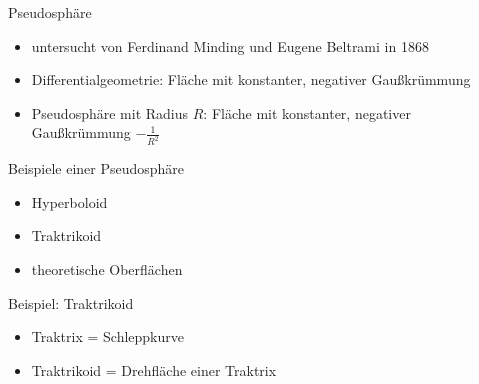 \documentclass[12pt]{beamer}
\begin{document}
\begin{frame}{Pseudosphäre}

\begin{itemize}
\item untersucht von Ferdinand Minding und Eugene Beltrami in 1868
\item Differentialgeometrie: Fläche mit konstanter, negativer Gaußkrümmung\cite{pseudo_wiki}
\item Pseudosphäre mit Radius $R$: Fläche mit konstanter, negativer Gaußkrümmung $-\frac{1}{R^2}$ \cite{pseudo_mathcurve}
 \cite{pseudo_wiki}
\end{itemize}

\end{frame}

\begin{frame}{Beispiele einer Pseudosphäre}

\begin{itemize}
\item Hyperboloid
\item Traktrikoid
\item theoretische Oberflächen
\end{itemize}

\end{frame}

\begin{frame}{Beispiel: Traktrikoid}

\begin{itemize}
\item Traktrix = Schleppkurve
\item Traktrikoid = Drehfläche einer Traktrix
\end{itemize}

\end{frame}
\end{document}
